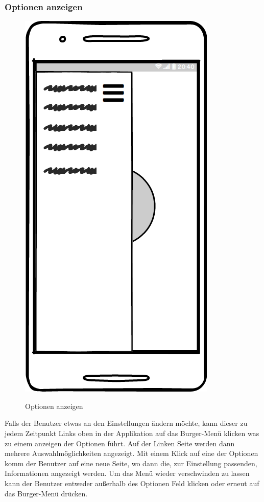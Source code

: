 \subsubsection{Optionen anzeigen}
\begin{figure}[H]
	\centering
	\includegraphics[width=.5\linewidth]{pictures/Mobile/Options.png}\
	\caption{Optionen anzeigen}
\end{figure}
Falls der Benutzer etwas an den Einstellungen ändern möchte, kann dieser zu jedem Zeitpunkt Links oben in der Applikation auf das Burger-Menü klicken was zu einem anzeigen der Optionen führt. Auf der Linken Seite werden dann mehrere Auswahlmöglichkeiten angezeigt. Mit einem Klick auf eine der Optionen komm der Benutzer auf eine neue Seite, wo dann die, zur Einstellung passenden, Informationen angezeigt werden. Um das Menü wieder verschwinden zu lassen kann der Benutzer entweder außerhalb des Optionen Feld klicken oder erneut auf das Burger-Menü drücken. 
